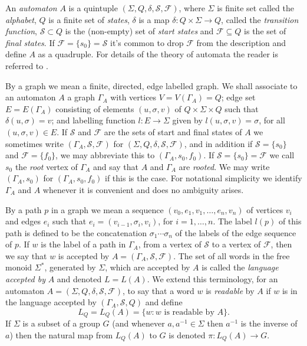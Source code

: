 \documentclass[a4paper,12pt]{article}
\newcommand{\G}{\Gamma }
\renewcommand{\d}{\delta }
\newcommand{\s}{\sigma }
\renewcommand{\S}{\Sigma }
\newcommand{\cF}{{\cal{F}}}
\newcommand{\cS}{{\cal{S}}}
\numberwithin{equation}{section}
\numberwithin{figure}{section}
\renewcommand{\cF}{\mathcal{F}}
\renewcommand{\cS}{\mathcal{S}}
\newcommand{\maps}{\rightarrow}
\begin{document}
An {\em automaton} $A$ is  a quintuple
$(\S,Q,\d,\mathcal{S},\mathcal{F})$, where $\S$ is finite set
called the {\em alphabet}, $Q$ is a finite set of {\em states},
$\d$ is a map $\d:Q\times \S\maps Q$, called the {\em transition
function}, $\mathcal{S}\subset Q$ is the (non-empty) set of {\em
start states} and $\mathcal{F}\subseteq Q$ is the set of {\em
final states}.  If
$\mathcal{F}=\{s_0\}=\mathcal{S}$ it's common to drop
$\mathcal{F}$ from the description and define $A$ as a quadruple.
For details of the theory of automata the reader is referred to
 \cite{Lawson04}.

By a graph we mean a finite, directed, edge labelled graph.
We shall associate to an automaton $A$
a graph $\G_A$ with vertices
$V=V(\G_A)=Q$; edge set $E=E(\G_A)$ consisting of elements
$(u,\s,v)$ of $Q\times \S\times Q$ such that $\d(u,\s)=v$; and
labelling function $l:E\maps \S$ given by $l(u,\s,v)=\s$, for all
$(u,\s,v) \in E$.  If $\mathcal{S}$ and $\mathcal{F}$ are the sets
of start and final states of $A$ we sometimes write
$(\G_A,\mathcal{S},\mathcal{F})$ for
$(\S,Q,\d,\mathcal{S},\mathcal{F})$, and in addition if
$\mathcal{S}=\{s_0\}$ and $\mathcal{F}=\{f_0\}$, we may abbreviate
this to $(\G_A,s_0,f_0)$. If $\mathcal{S}=\{s_0\}=\mathcal{F}$
we
call $s_0$ the {\em root}
vertex of $\G_A$ and say that $A$ and $\G_A$ are {\em rooted}. We may
 write $(\G_A,s_0)$ for $(\G_A,s_0,f_0)$ if this is the case.  
For notational simplicity we identify $\G_A$
and $A$ whenever it is convenient and does no ambiguity arises.

By a path $p$
in a graph we mean a sequence $(v_0,e_1,v_1, \ldots , e_n ,v_n)$ of
 vertices $v_i$ and edges $e_i$ such that
 $e_i=(v_{i-1},\s_i,v_i)$, for $i=1,\ldots ,n$.
The
label $l(p)$ of this  path is defined to be
 the concatenation $\s_1\cdots \s_n$ of the labels of the
edge sequence of $p$.  If $w$ is the label of a path
in $\G_A$, from a vertex of $\cS$ to a vertex of $\cF$, then we
say that $w$ is accepted by $A=(\G_A,\cS,\cF)$. The set of all
words in the free monoid $\S^*$, generated by $\S$, which are
accepted by $A$  is called
the {\em language accepted by} $A$ and denoted $L=L(A)$.
We extend this terminology, for an automaton
$A=(\S,Q,\d,\mathcal{S},\mathcal{F})$,
to say that a  word $w$ is {\em readable}
by $A$ if $w$ is in the
language accepted by $(\G_A,\cS,Q)$  and define
\[L_Q=L_Q(A)=\{w:w \textrm{ is readable by } A\}.\]
If $\S$ is a
subset of a group $G$ (and whenever $a,a^{-1}\in \S$ then $a^{-1}$ is
the inverse of $a$)
 then the  natural map from $L_Q(A)$ to
$G$ is denoted $\pi:L_Q(A)\maps G$.
\end{document}
